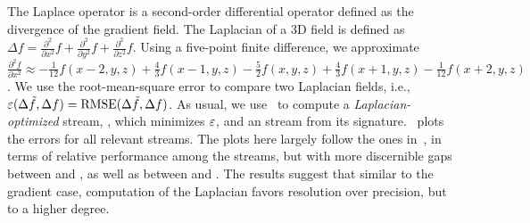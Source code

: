 The Laplace operator is a second-order differential operator defined as the divergence of the
gradient field. The Laplacian of a 3D field is defined as $\Delta f = 
\frac{{\partial}^2}{\partial{x^2}}f+\frac{{\partial}^2}{\partial{y^2}}f+\frac{{\partial}^2}{\partial{z^2}}f$.
%
Using a five-point finite difference, we approximate 
$\frac{{\partial}^2 f}{\partial{x^2}}
\approx
-\frac{1}{12}f(x-2,y,z)+\frac{4}{3}f(x-1,y,z)-\frac{5}{2}f(x,y,z)+\frac{4}{3}f(x+1,y,z)-\frac{1}{12}f(x+2,y,z)$.
We use the root-mean-square error to compare two Laplacian fields, i.e., $\err(\Delta
\tilde{f},\Delta f)=\text{RMSE}(\Delta \tilde{f},\Delta f)$. As usual, we use~ to
compute a \emph{Laplacian-optimized} stream, \slop, which minimizes $\err$, and an \slsg stream from
its signature.~ plots the errors for all relevant streams. The
plots here largely follow the ones in~, in terms of relative
performance among the streams, but with more discernible gaps between \sbit and \slsg, as well as
between \slsg and \sbit. The results suggest that similar to the gradient case, computation of the
Laplacian favors resolution over precision, but to a higher degree.